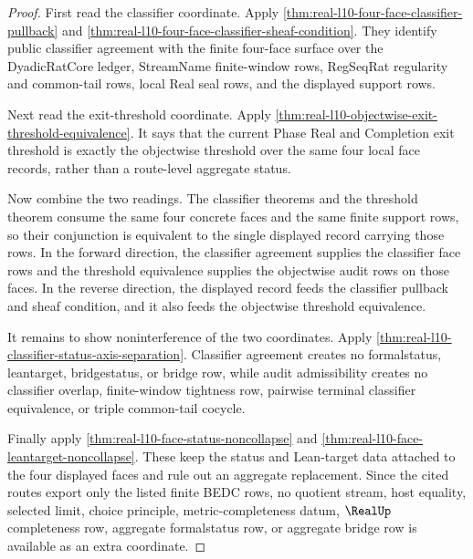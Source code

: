 \begin{proof}
First read the classifier coordinate. Apply \autoref{thm:real-l10-four-face-classifier-pullback} and \autoref{thm:real-l10-four-face-classifier-sheaf-condition}. They identify public classifier agreement with the finite four-face surface over the DyadicRatCore ledger, StreamName finite-window rows, RegSeqRat regularity and common-tail rows, local Real seal rows, and the displayed support rows.

Next read the exit-threshold coordinate. Apply \autoref{thm:real-l10-objectwise-exit-threshold-equivalence}. It says that the current Phase Real and Completion exit threshold is exactly the objectwise threshold over the same four local face records, rather than a route-level aggregate status.

Now combine the two readings. The classifier theorems and the threshold theorem consume the same four concrete faces and the same finite support rows, so their conjunction is equivalent to the single displayed record carrying those rows. In the forward direction, the classifier agreement supplies the classifier face rows and the threshold equivalence supplies the objectwise audit rows on those faces. In the reverse direction, the displayed record feeds the classifier pullback and sheaf condition, and it also feeds the objectwise threshold equivalence.

It remains to show noninterference of the two coordinates. Apply \autoref{thm:real-l10-classifier-status-axis-separation}. Classifier agreement creates no formalstatus, leantarget, bridgestatus, or bridge row, while audit admissibility creates no classifier overlap, finite-window tightness row, pairwise terminal classifier equivalence, or triple common-tail cocycle.

Finally apply \autoref{thm:real-l10-face-status-noncollapse} and \autoref{thm:real-l10-face-leantarget-noncollapse}. These keep the status and Lean-target data attached to the four displayed faces and rule out an aggregate replacement. Since the cited routes export only the listed finite BEDC rows, no quotient stream, host equality, selected limit, choice principle, metric-completeness datum, $\RealUp$ completeness row, aggregate formalstatus row, or aggregate bridge row is available as an extra coordinate.
\end{proof}

